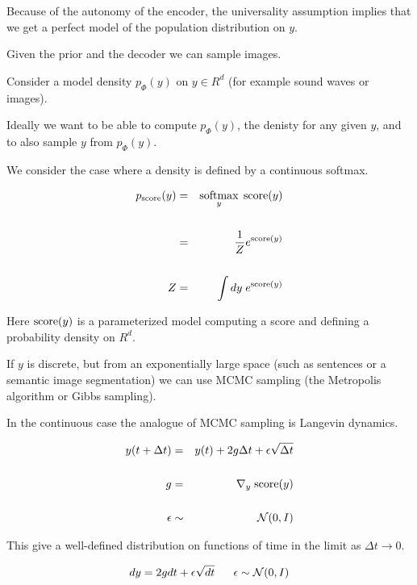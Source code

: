 {\vfill
Because of the autonomy of the encoder, the universality assumption implies that we get a perfect model of the population distribution on $y$.

\vfill
Given the prior and the decoder we can sample images.


Consider a model density $p_\Phi(y)$ on $y \in R^d$ (for example sound waves or images).

\vfill
Ideally we want to be able to compute $p_\Phi(y)$, the denisty for any given $y$, and to also sample $y$ from $p_\Phi(y)$.


We consider the case where a density is defined by a continuous softmax.

\vfill
\begin{eqnarray*}
  p_{\mathrm{score}}(y) & = & \operatorname*{softmax}_y\; \mathrm{score}(y) \\
  \\
  & = & \frac{1}{Z} e^{\mathrm{score}(y)} \\
  \\
  Z & = & \int dy\;e^{\mathrm{score}(y)}
\end{eqnarray*}

\vfill
Here $\mathrm{score}(y)$ is a parameterized model computing a score and defining a probability density on $R^d$.


If $y$ is discrete, but from an exponentially large space (such as sentences or a semantic image segmentation) we can use MCMC sampling
(the Metropolis algorithm or Gibbs sampling).

\vfill
In the continuous case the analogue of MCMC sampling is Langevin dynamics.


\begin{eqnarray*}
y(t + \Delta t) & = & y(t) + 2g\Delta t +  \epsilon \sqrt{\Delta t} \\
\\
g & = & \nabla_y\;\mathrm{score}(y) \\
\\
\epsilon & \sim & {\cal N}(0,I)
\end{eqnarray*}

\vfill
This give a well-defined distribution on functions of time in the limit as $\Delta t \rightarrow 0$.

{\color{red} $$dy =  2 g dt + \epsilon \sqrt{dt}\;\;\;\;\;\; \epsilon \sim {\cal N}(0,I)$$}

}
